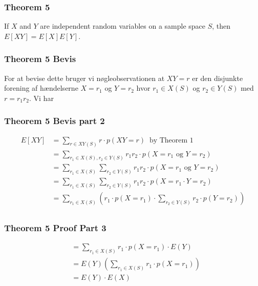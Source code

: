 \documentclass{beamer}
\begin{document}
\begin{frame}
  \frametitle{Theorem 5}
  \begin{theorem}[Theorem 5]
    If $X$ and $Y$ are independent random variables on a sample space $S$, then $E[XY] = E[X]E[Y]$.
  \end{theorem}
\end{frame}

\begin{frame}[allowframebreaks]
  \frametitle{Theorem 5 Bevis}
  For at bevise dette bruger vi nøgleobservationen at $XY = r$  er den disjunkte forening af hændelserne $X = r_{1}$ og $Y= r_{2}$ hvor $r_{1} \in X(S)$ og $r_{2} \in Y(S)$ med $r = r_{1}r_{2}$. Vi har

\end{frame}

\begin{frame}
  \frametitle{Theorem 5 Bevis part 2}
  \begin{equation*}
    \begin{split}
      E[XY] &= \sum_{r \in XY(S)}^{} r \cdot p(XY = r)\;\; \text{by Theorem 1}\\
            &= \sum_{r_{1} \in X(S), r_{2} \in Y(S)}^{} r_{1} r_{2} \cdot p(X = r_{1} \text{ og } Y = r_{2})\\
            &= \sum_{r_{1} \in X(S)}^{} \sum_{r_{2} \in Y(S)}^{} r_{1} r_{2} \cdot p(X = r_{1} \text{ og } Y = r_{2})\\
            &= \sum_{r_{1} \in X(S)}^{} \sum_{r_{2} \in Y(S)}^{} r_{1} r_{2} \cdot p(X = r_{1} \cdot Y = r_{2})\\
            &= \sum_{r_{1} \in X(S)}^{} \left(  r_{1} \cdot p(X=r_{1}) \cdot \sum_{r_{2} \in Y(S)}^{} r_{2} \cdot p(Y=r_{2}) \right)\\
    \end{split}
  \end{equation*}
\end{frame}


\begin{frame}
  \frametitle{Theorem 5 Proof Part 3}
  
  \begin{equation*}
    \begin{split}
      &= \sum_{r_{1} \in X(S)} r_{1} \cdot p(X = r_{1}) \cdot E(Y)\\
      &= E(Y) \left( \sum_{r_{1} \in X(S)} r_{1} \cdot p(X = r_{1}) \right)\\
      &= E(Y) \cdot E(X)
    \end{split}
  \end{equation*}
\end{frame}
\end{document}

